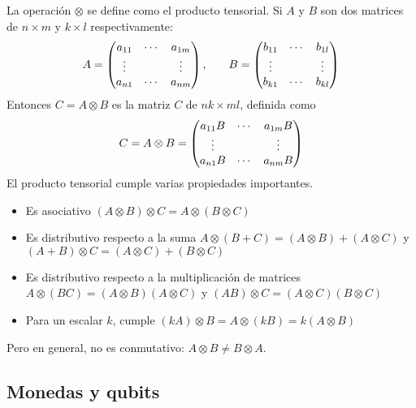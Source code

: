 La operación $\otimes$ se define como el producto tensorial.  Si $A$ y $B$ 
son dos matrices de $n \times m$ y $k \times l$ respectivamente:
%
$$
\begin{array}{c c}
	A=\begin{pmatrix} 
		a_{11} & \cdots & a_{1m} \\
		\vdots &        & \vdots \\
		a_{n1} & \cdots & a_{nm}
	 \end{pmatrix}
	,\quad
	&
	B=\begin{pmatrix} 
		b_{11} & \cdots & b_{1l} \\
		\vdots &        & \vdots \\
		b_{k1} & \cdots & b_{kl}
	 \end{pmatrix}
\end{array}
$$
%
Entonces $C = A \otimes B$ es la matriz $C$ de $nk \times ml$, 
definida como
%
$$
C = A \otimes B = \begin{pmatrix} 
	a_{11} B & \cdots & a_{1m} B \\
	\vdots   &        & \vdots   \\
	a_{n1} B & \cdots & a_{nm} B
 \end{pmatrix}
$$
%
El producto tensorial cumple varias propiedades importantes.
%
\begin{itemize}
\item Es asociativo $(A \otimes B) \otimes C = A \otimes (B \otimes C)$

\item Es distributivo respecto a la suma $A \otimes (B + C) = (A \otimes B) + (A
\otimes C) $ y $(A + B) \otimes C = (A \otimes C) + (B \otimes C)$

\item Es distributivo respecto a la multiplicación de matrices $A \otimes (B 
 C) = (A \otimes B)  (A \otimes C) $ y $(A  B) \otimes C = (A 
\otimes C)  (B \otimes C)$

\item Para un escalar $k$, cumple $(kA) \otimes B = A \otimes (kB) = k (A 
\otimes B)$
\end{itemize}
%
Pero en general, no es conmutativo: $A \otimes B \neq B \otimes A$.

\subsection{Monedas y qubits}

